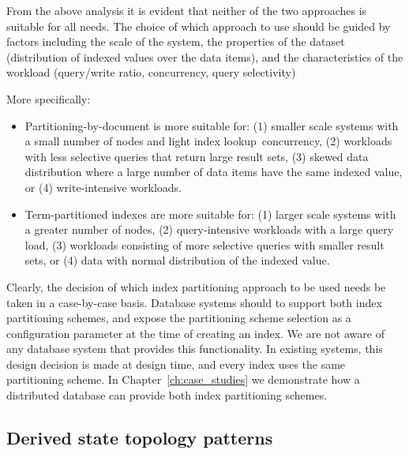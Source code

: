 From the above analysis it is evident that neither of the two approaches is suitable for all needs.
The choice of which approach to use should be guided by factors including the scale of the system,
the properties of the dataset (distribution of indexed values over the data items),
and the characteristics of the workload (query/write ratio, concurrency, query selectivity)

More specifically:
\begin{itemize}

  \item Partitioning-by-document is more suitable for:
  (1) smaller scale systems with a small number of nodes and light index lookup concurrency,
  (2) workloads with less selective queries that return large result sets,
  (3) skewed data distribution where a large number of data items have the same indexed value,
  or (4) write-intensive workloads.

  \item Term-partitioned indexes are more suitable for:
  (1) larger scale systems with a greater number of nodes,
  (2) query-intensive workloads with a large query load,
  (3) workloads consisting of more selective queries with smaller result sets,
  or (4) data with normal distribution of the indexed value.

\end{itemize}

Clearly, the decision of which index partitioning approach to be used needs be taken in a case-by-case basis.
Database systems should to support both index partitioning schemes, and expose the partitioning scheme selection as a
configuration parameter at the time of creating an index.
We are not aware of any database system that provides this functionality.
In existing systems, this design decision is made at design time, and every index uses the same partitioning scheme.
\cite{kejriwal:slik, tan:diffindex, riakv:secondaryindexes, cassandra:secondaryindexing}
In Chapter~\ref{ch:case_studies} we demonstrate how a distributed database can provide both index partitioning
schemes.


\subsection{Derived state topology patterns}
\label{sec:topology_patterns}


